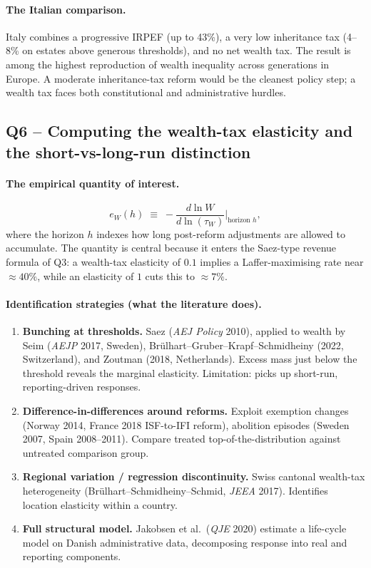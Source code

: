 \documentclass[11pt,a4paper]{article}
\begin{document}
\paragraph{The Italian comparison.}
Italy combines a progressive IRPEF (up to 43\%), a very low inheritance tax (4--8\% on estates above generous thresholds), and no net wealth tax. The result is among the highest reproduction of wealth inequality across generations in Europe. A moderate inheritance-tax reform would be the cleanest policy step; a wealth tax faces both constitutional and administrative hurdles.

\subsection*{Q6 -- Computing the wealth-tax elasticity and the short-vs-long-run distinction}

\paragraph{The empirical quantity of interest.}
\[
e_{W}(h)\;\equiv\;-\frac{d\ln W}{d\ln(\tau_{W})}\bigg|_{\text{horizon }h},
\]
where the horizon $h$ indexes how long post-reform adjustments are allowed to accumulate. The quantity is central because it enters the Saez-type revenue formula of Q3: a wealth-tax elasticity of $0.1$ implies a Laffer-maximising rate near $\approx 40\%$, while an elasticity of $1$ cuts this to $\approx 7\%$.

\paragraph{Identification strategies (what the literature does).}
\begin{enumerate}[leftmargin=*,itemsep=1pt]
    \item \textbf{Bunching at thresholds.} Saez (\emph{AEJ Policy} 2010), applied to wealth by Seim (\emph{AEJP} 2017, Sweden), Brülhart--Gruber--Krapf--Schmidheiny (2022, Switzerland), and Zoutman (2018, Netherlands). Excess mass just below the threshold reveals the marginal elasticity. Limitation: picks up short-run, reporting-driven responses.
    \item \textbf{Difference-in-differences around reforms.} Exploit exemption changes (Norway 2014, France 2018 ISF-to-IFI reform), abolition episodes (Sweden 2007, Spain 2008--2011). Compare treated top-of-the-distribution against untreated comparison group.
    \item \textbf{Regional variation / regression discontinuity.} Swiss cantonal wealth-tax heterogeneity (Brülhart--Schmidheiny--Schmid, \emph{JEEA} 2017). Identifies location elasticity within a country.
    \item \textbf{Full structural model.} Jakobsen et al.\ (\emph{QJE} 2020) estimate a life-cycle model on Danish administrative data, decomposing response into real and reporting components.
\end{enumerate}
\end{document}
